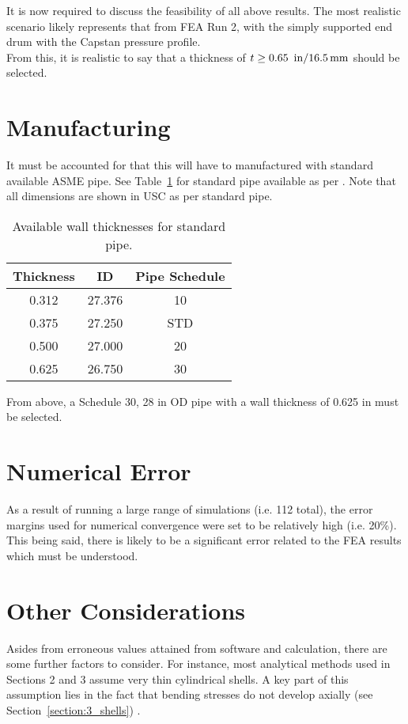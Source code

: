 It is now required to discuss the feasibility of all above results. The most realistic scenario likely represents that from FEA Run 2, with the simply supported end drum with the Capstan pressure profile.\\

From this, it is realistic to say that a thickness of $t\geq 0.65\ \,\mathrm{in} /\/ 16.5\,\mathrm{mm}$ should be selected. 

\section{Manufacturing}

It must be accounted for that this will have to manufactured with standard available ASME pipe. See Table~\ref{table:5_pipe} for standard pipe available as per \cite{PIPEINFO}. Note that all dimensions are shown in USC as per standard pipe.

\begin{table}[H]
	\caption[Available wall thicknesses for standard pipe.]{Available wall thicknesses for standard pipe.\protect\cite{PIPEINFO}}
	\centering
	\begin{tabular}{ccc}
    \textbf{Thickness} & \textbf{ID} & \textbf{Pipe Schedule} \\
    \midrule
    0.312 & 27.376 & 10 \\
    0.375 & 27.250 & STD \\
    0.500 & 27.000 & 20 \\
    0.625 & 26.750 & 30 \\
    \end{tabular}%
	\label{table:5_pipe}
\end{table}

From above, a Schedule 30, 28 in OD pipe with a wall thickness of 0.625 in must be selected.

\section{Numerical Error}
As a result of running a large range of \cite{ANSYS} simulations (i.e. 112 total), the error margins used for numerical convergence were set to be relatively high (i.e. 20\%). This being said, there is likely to be a significant error related to the FEA results which must be understood.


\section{Other Considerations}
Asides from erroneous values attained from software and calculation, there are some further factors to consider. For instance, most analytical methods used in Sections 2 and 3 assume very thin cylindrical shells. A key part of this assumption lies in the fact that bending stresses do not develop axially (see Section~\ref{section:3_shells}) \cite{timoshenko1959theory}. \\

